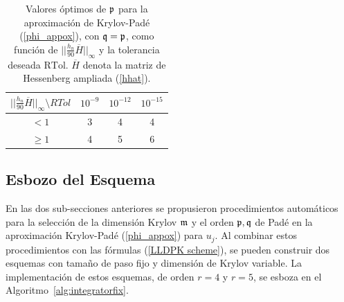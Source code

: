 \begin{table}[htb]
	\caption{Valores óptimos de $\mathfrak{p}$ para la aproximación de Krylov-Padé (\ref{phi_appox}), con $\mathfrak{q}=\mathfrak{p}$, como función de $\lvert\lvert \frac{h_n}{90}\overline{H} \rvert\rvert_\infty$ y la tolerancia deseada $\mathrm{RTol}$. $\overline{H}$ denota la matriz de Hessenberg ampliada (\ref{hhat}).}
	\begin{center}
		\begin{tabular}{cccc}
			\hline
			$\lvert\lvert \frac{h_n}{90}\overline{H} \rvert\rvert_\infty \setminus RTol$ & $10^{-9}$ & $10^{-12}$ & $10^{-15}$ \\
			\hline
			$<1$ & 3 & 4 & 4 \\
			$\geq 1$ & 4 & 5 & 6 \\
			\hline
		\end{tabular}
		\label{table:padep}
	\end{center}
\end{table}

\subsection{Esbozo del Esquema}

En las dos sub-secciones anteriores se propusieron procedimientos automáticos para la selección de la dimensión Krylov $\mathfrak{m}$ y el orden $\mathfrak{p},\mathfrak{q}$ de Padé en la aproximación Krylov-Padé (\ref{phi_appox}) para $u_j$. Al combinar estos procedimientos con las fórmulas (\ref{LLDPK scheme}), se pueden construir dos esquemas con tamaño de paso fijo y dimensión de Krylov variable. La implementación de estos esquemas, de orden $r=4$ y $r=5$, se esboza en el Algoritmo~\ref{alg:integratorfix}.

